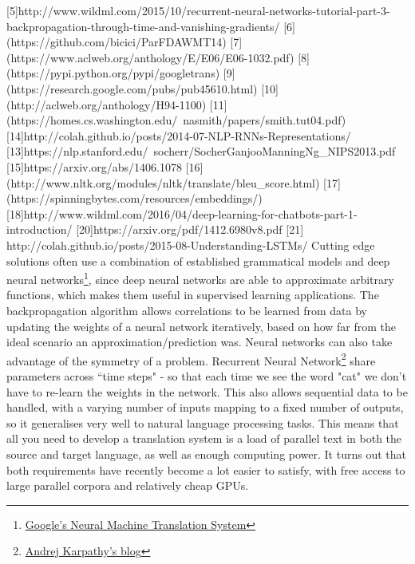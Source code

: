 \documentclass[]{article}
\begin{document}
[5]http://www.wildml.com/2015/10/recurrent-neural-networks-tutorial-part-3-backpropagation-through-time-and-vanishing-gradients/
[6](https://github.com/bicici/ParFDAWMT14)
[7](https://www.aclweb.org/anthology/E/E06/E06-1032.pdf)
[8](https://pypi.python.org/pypi/googletrans)
[9](https://research.google.com/pubs/pub45610.html)
[10](http://aclweb.org/anthology/H94-1100)
[11](https://homes.cs.washington.edu/~nasmith/papers/smith.tut04.pdf)
[14]http://colah.github.io/posts/2014-07-NLP-RNNs-Representations/
[13]https://nlp.stanford.edu/~socherr/SocherGanjooManningNg_NIPS2013.pdf
[15]https://arxiv.org/abs/1406.1078
[16](http://www.nltk.org/modules/nltk/translate/bleu_score.html)
[17](https://spinningbytes.com/resources/embeddings/)
[18]http://www.wildml.com/2016/04/deep-learning-for-chatbots-part-1-introduction/
[20]https://arxiv.org/pdf/1412.6980v8.pdf
[21] http://colah.github.io/posts/2015-08-Understanding-LSTMs/
\fi
Cutting edge solutions often use a combination of established grammatical models and deep neural networks\footnote{\href{https://arxiv.org/pdf/1406.1078.pdf}{Google's Neural Machine Translation System}}, since deep neural networks are able to approximate arbitrary functions, which makes them useful in supervised learning applications. The backpropagation algorithm allows correlations to be learned from data by updating the weights of a neural network iteratively, based on how far from the ideal scenario an approximation/prediction was. Neural networks can also take advantage of the symmetry of a problem. Recurrent Neural Network\footnote{\href{http://karpathy.github.io/2015/05/21/rnn-effectiveness/}{Andrej Karpathy's blog}} share parameters across ``time steps" - so that each time we see the word "cat" we don't have to re-learn the weights in the network. This also allows sequential data to be handled, with a varying number of inputs mapping to a fixed number of outputs, so it generalises very well to natural language processing tasks. This means that all you need to develop a translation system is a load of parallel text in both the source and target language, as well as enough computing power. It turns out that both requirements have recently become a lot easier to satisfy, with free access to large parallel corpora and relatively cheap GPUs.
\end{document}
